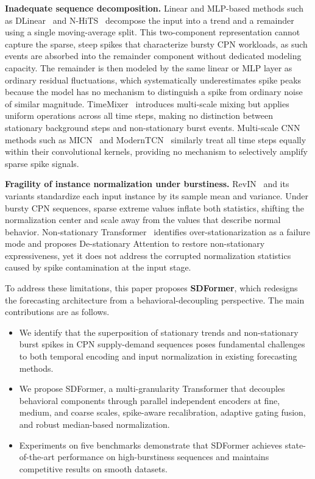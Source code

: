 \documentclass[journal]{IEEEtran}
\begin{document}
\textbf{Inadequate sequence decomposition.}
Linear and MLP-based methods such as DLinear~\cite{dlinear} and
N-HiTS~\cite{nhits} decompose the input into a trend and a remainder
using a single moving-average split.
This two-component representation cannot capture the sparse, steep spikes
that characterize bursty CPN workloads, as such events are absorbed into
the remainder component without dedicated modeling capacity.
The remainder is then modeled by the same linear or MLP layer as
ordinary residual fluctuations, which systematically underestimates
spike peaks because the model has no mechanism to distinguish a spike
from ordinary noise of similar magnitude.
TimeMixer~\cite{timemixer} introduces multi-scale mixing but applies
uniform operations across all time steps, making no distinction between
stationary background steps and non-stationary burst events.
Multi-scale CNN methods such as MICN~\cite{micn} and ModernTCN~\cite{moderntcn}
similarly treat all time steps equally within their convolutional kernels,
providing no mechanism to selectively amplify sparse spike signals.

\textbf{Fragility of instance normalization under burstiness.}
RevIN~\cite{revin} and its variants standardize each input instance by
its sample mean and variance.
Under bursty CPN sequences, sparse extreme values inflate both statistics,
shifting the normalization center and scale away from the values that
describe normal behavior.
Non-stationary Transformer~\cite{nonstationary} identifies
over-stationarization as a failure mode and proposes De-stationary
Attention to restore non-stationary expressiveness, yet it does not
address the corrupted normalization statistics caused by spike
contamination at the input stage.

To address these limitations, this paper proposes \textbf{SDFormer}, which
redesigns the forecasting architecture from a behavioral-decoupling
perspective.
The main contributions are as follows.

\begin{itemize}
  \item We identify that the superposition of stationary trends and
    non-stationary burst spikes in CPN supply-demand sequences poses
    fundamental challenges to both temporal encoding and input
    normalization in existing forecasting methods.

  \item We propose SDFormer, a multi-granularity Transformer that decouples
    behavioral components through parallel independent encoders at fine,
    medium, and coarse scales, spike-aware recalibration, adaptive gating
    fusion, and robust median-based normalization.

  \item Experiments on five benchmarks demonstrate that SDFormer achieves
    state-of-the-art performance on high-burstiness sequences and maintains
    competitive results on smooth datasets.
\end{itemize}
\end{document}
